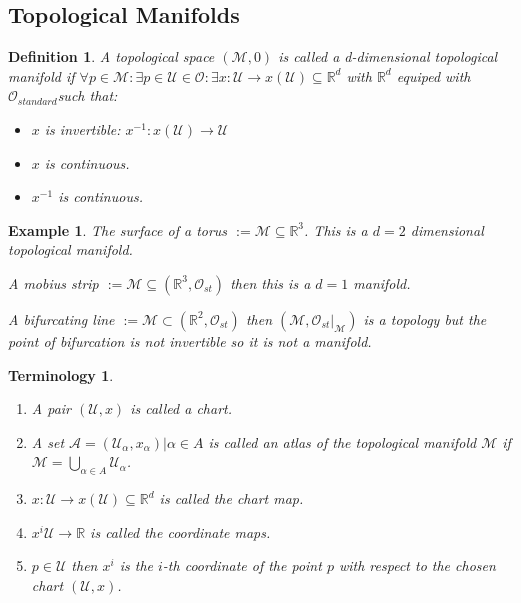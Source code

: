 \documentclass[10pt, oneside]{article}
\newcommand{\R}{\mathbb{R}}
\newcommand{\M}{\mathcal{M}}
\newtheorem{defn}{Definition}
\newtheorem{example}{Example}
\newtheorem{Terminology}{Terminology}
\begin{document}
     \subsection{Topological Manifolds}
        \begin{defn}
           A topological space $(\M, \mathcal{0})$ is called a d-dimensional topological manifold if $\forall p \in \M: \exists p \in \mathcal{U} \in \mathcal{O} : \exists x:\mathcal{U} \to x(\mathcal{U}) \subseteq \R^d$ with $\R^d$ equiped with $\mathcal{O}_{standard}$such that:
           \begin{itemize}
              \item $x$ is invertible: $x^{-1}: x(\mathcal{U}) \to \mathcal{U}$
              \item $x$ is continuous.
              \item $x^{-1}$ is continuous.
           \end{itemize}
        \end{defn}
        \begin{example}
           \item The surface of a torus $:= \M \subseteq \R^3$. This is a $d=2$ dimensional topological manifold.
           \item A mobius strip $:= \M \subseteq (\R^3,\mathcal{O}_{st})$ then this is a $d=1$ manifold.
           \item A bifurcating line $:= \M \subset (\R^2,\mathcal{O}_{st})$ then $(\M, \mathcal{O}_{st}|_{\M})$ is a topology but the point of bifurcation is not invertible so it is not a manifold.
        \end{example}
        \begin{Terminology}
           \begin{enumerate}
              \item A pair $(\mathcal{U},x)$ is called a chart.
              \item A set $\mathcal{A}={(\mathcal{U_\alpha},x_{\alpha})|\alpha \in A}$ is called an atlas of the topological manifold $\M$ if $\mathcal{M} = \bigcup_{\alpha \in A} \mathcal{U}_\alpha$.
              \item $x:\mathcal{U} \to x(\mathcal{U}) \subseteq \R^d$ is called the chart map.
              \item $x^{i} \mathcal{U} \to \R$ is called the coordinate maps.
              \item $p \in \mathcal{U}$ then $x^{i}$ is the $i$-th coordinate of the point $p$ with respect to the chosen chart $(\mathcal{U},x)$.
           \end{enumerate}
        \end{Terminology}
\end{document}
